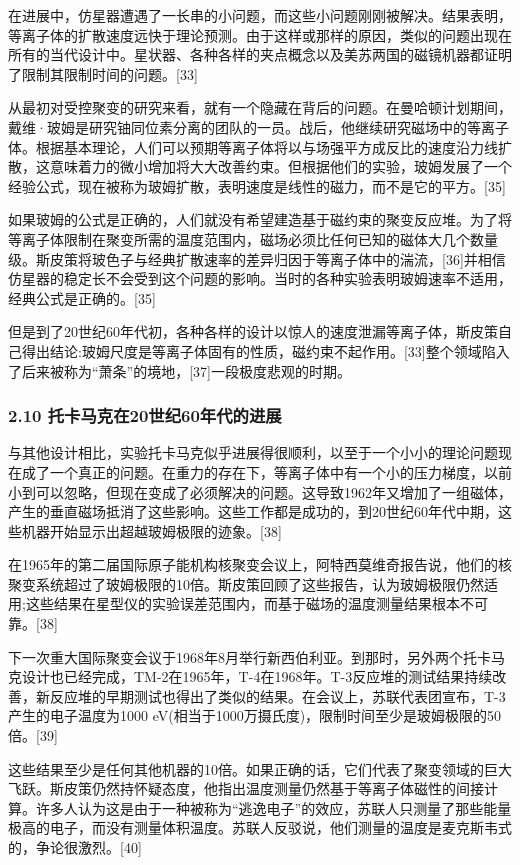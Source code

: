 在进展中，仿星器遭遇了一长串的小问题，而这些小问题刚刚被解决。结果表明，等离子体的扩散速度远快于理论预测。由于这样或那样的原因，类似的问题出现在所有的当代设计中。星状器、各种各样的夹点概念以及美苏两国的磁镜机器都证明了限制其限制时间的问题。[33]

从最初对受控聚变的研究来看，就有一个隐藏在背后的问题。在曼哈顿计划期间，戴维·玻姆是研究铀同位素分离的团队的一员。战后，他继续研究磁场中的等离子体。根据基本理论，人们可以预期等离子体将以与场强平方成反比的速度沿力线扩散，这意味着力的微小增加将大大改善约束。但根据他们的实验，玻姆发展了一个经验公式，现在被称为玻姆扩散，表明速度是线性的磁力，而不是它的平方。[35]

如果玻姆的公式是正确的，人们就没有希望建造基于磁约束的聚变反应堆。为了将等离子体限制在聚变所需的温度范围内，磁场必须比任何已知的磁体大几个数量级。斯皮策将玻色子与经典扩散速率的差异归因于等离子体中的湍流，[36]并相信仿星器的稳定长不会受到这个问题的影响。当时的各种实验表明玻姆速率不适用，经典公式是正确的。[35]

但是到了20世纪60年代初，各种各样的设计以惊人的速度泄漏等离子体，斯皮策自己得出结论:玻姆尺度是等离子体固有的性质，磁约束不起作用。[33]整个领域陷入了后来被称为“萧条”的境地，[37]一段极度悲观的时期。
\subsubsection{2.10 托卡马克在20世纪60年代的进展}
与其他设计相比，实验托卡马克似乎进展得很顺利，以至于一个小小的理论问题现在成了一个真正的问题。在重力的存在下，等离子体中有一个小的压力梯度，以前小到可以忽略，但现在变成了必须解决的问题。这导致1962年又增加了一组磁体，产生的垂直磁场抵消了这些影响。这些工作都是成功的，到20世纪60年代中期，这些机器开始显示出超越玻姆极限的迹象。[38]

在1965年的第二届国际原子能机构核聚变会议上，阿特西莫维奇报告说，他们的核聚变系统超过了玻姆极限的10倍。斯皮策回顾了这些报告，认为玻姆极限仍然适用;这些结果在星型仪的实验误差范围内，而基于磁场的温度测量结果根本不可靠。[38]

下一次重大国际聚变会议于1968年8月举行新西伯利亚。到那时，另外两个托卡马克设计也已经完成，TM-2在1965年，T-4在1968年。T-3反应堆的测试结果持续改善，新反应堆的早期测试也得出了类似的结果。在会议上，苏联代表团宣布，T-3产生的电子温度为1000 eV(相当于1000万摄氏度)，限制时间至少是玻姆极限的50倍。[39]

这些结果至少是任何其他机器的10倍。如果正确的话，它们代表了聚变领域的巨大飞跃。斯皮策仍然持怀疑态度，他指出温度测量仍然基于等离子体磁性的间接计算。许多人认为这是由于一种被称为“逃逸电子”的效应，苏联人只测量了那些能量极高的电子，而没有测量体积温度。苏联人反驳说，他们测量的温度是麦克斯韦式的，争论很激烈。[40]

